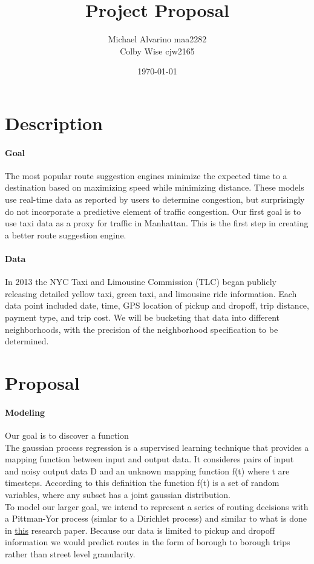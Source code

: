 \documentclass{article}
\begin{document}
\title{\textbf{Project Proposal}}
\date{\today}
\author{
Michael Alvarino maa2282\\
Colby Wise cjw2165
}

\maketitle

\section{Description}

\paragraph{Goal} The most popular route suggestion engines minimize the expected time to a destination based on maximizing speed while minimizing distance. These models use real-time data as reported by users to determine congestion, but surprisingly do not incorporate a predictive element of traffic congestion. Our first goal is to use taxi data as a proxy for traffic in Manhattan. This is the first step in creating a better route suggestion engine.

\paragraph{Data} In 2013 the NYC Taxi and Limousine Commission (TLC) began publicly releasing detailed yellow taxi, green taxi, and limousine ride information. Each data point included date, time, GPS location of pickup and dropoff, trip distance, payment type, and trip cost. We will be bucketing that data into different neighborhoods, with the precision of the neighborhood specification to be determined.

\section{Proposal}

\paragraph{Modeling}

Our goal is to discover a function \\
The gaussian process regression is a supervised learning technique that provides a mapping function between input and output data. It consideres pairs of input and noisy output data D and an unknown mapping function f(t) where t are timesteps. According to this definition the function f(t) is a set of random variables, where any subset has a joint gaussian distribution. \\
To model our larger goal, we intend to represent a series of routing decisions with a Pittman-Yor process (simlar to a Dirichlet process) and similar to what is done in \href{http://web.mit.edu/jaillet/www/general/IAT2012.pdf}{this} research paper. Because our data is limited to pickup and dropoff information we would predict routes in the form of borough to borough trips rather than street level granularity.
\end{document}
